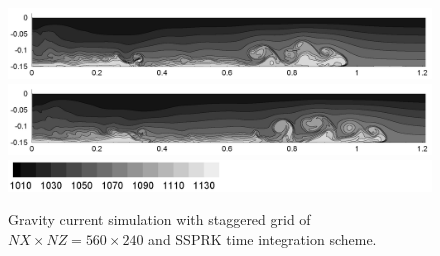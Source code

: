 \begin{figure}[htbp]
\begin{center}
\includegraphics[scale=0.55]{../figures/Staggered/Fig9case/060526a-560-240-00375-VE-6/07.png}    \includegraphics[scale=0.55]{../figures/Staggered/Fig9case/060526a-560-240-00375-VE-6/08.png}
\includegraphics[scale=0.55]{../figures/Staggered/Fig9case/label.png}
    \caption{Gravity current simulation with staggered grid of $NX \times NZ = 560 \times 240$ and SSPRK time integration scheme.}
    \label{fig:060526a-560-240-00375-VE-6}
  \end{center}
\end{figure}

